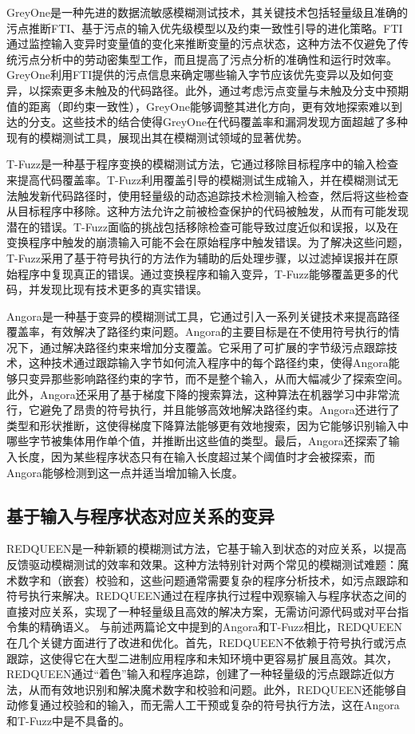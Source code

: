 \documentclass[10.5pt,compsoc]{CjC}
\theoremstyle{mystyle}
\begin{document}
GreyOne\cite{GREYONE}是一种先进的数据流敏感模糊测试技术，其关键技术包括轻量级且准确的污点推断FTI、基于污点的输入优先级模型以及约束一致性引导的进化策略。FTI通过监控输入变异时变量值的变化来推断变量的污点状态，这种方法不仅避免了传统污点分析中的劳动密集型工作，而且提高了污点分析的准确性和运行时效率。GreyOne利用FTI提供的污点信息来确定哪些输入字节应该优先变异以及如何变异，以探索更多未触及的代码路径。此外，通过考虑污点变量与未触及分支中预期值的距离（即约束一致性），GreyOne能够调整其进化方向，更有效地探索难以到达的分支。这些技术的结合使得GreyOne在代码覆盖率和漏洞发现方面超越了多种现有的模糊测试工具，展现出其在模糊测试领域的显著优势。

T-Fuzz\cite{T-Fuzz}是一种基于程序变换的模糊测试方法，它通过移除目标程序中的输入检查来提高代码覆盖率。T-Fuzz利用覆盖引导的模糊测试生成输入，并在模糊测试无法触发新代码路径时，使用轻量级的动态追踪技术检测输入检查，然后将这些检查从目标程序中移除。这种方法允许之前被检查保护的代码被触发，从而有可能发现潜在的错误。T-Fuzz面临的挑战包括移除检查可能导致过度近似和误报，以及在变换程序中触发的崩溃输入可能不会在原始程序中触发错误。为了解决这些问题，T-Fuzz采用了基于符号执行的方法作为辅助的后处理步骤，以过滤掉误报并在原始程序中复现真正的错误。通过变换程序和输入变异，T-Fuzz能够覆盖更多的代码，并发现比现有技术更多的真实错误。

Angora\cite{angora}是一种基于变异的模糊测试工具，它通过引入一系列关键技术来提高路径覆盖率，有效解决了路径约束问题。Angora的主要目标是在不使用符号执行的情况下，通过解决路径约束来增加分支覆盖。它采用了可扩展的字节级污点跟踪技术，这种技术通过跟踪输入字节如何流入程序中的每个路径约束，使得Angora能够只变异那些影响路径约束的字节，而不是整个输入，从而大幅减少了探索空间。此外，Angora还采用了基于梯度下降的搜索算法，这种算法在机器学习中非常流行，它避免了昂贵的符号执行，并且能够高效地解决路径约束。Angora还进行了类型和形状推断，这使得梯度下降算法能够更有效地搜索，因为它能够识别输入中哪些字节被集体用作单个值，并推断出这些值的类型。最后，Angora还探索了输入长度，因为某些程序状态只有在输入长度超过某个阈值时才会被探索，而Angora能够检测到这一点并适当增加输入长度。
\vspace {10mm}

\subsection{基于输入与程序状态对应关系的变异}
REDQUEEN\cite{redqueen}是一种新颖的模糊测试方法，它基于输入到状态的对应关系，以提高反馈驱动模糊测试的效率和效果。这种方法特别针对两个常见的模糊测试难题：魔术数字和（嵌套）校验和，这些问题通常需要复杂的程序分析技术，如污点跟踪和符号执行来解决。REDQUEEN通过在程序执行过程中观察输入与程序状态之间的直接对应关系，实现了一种轻量级且高效的解决方案，无需访问源代码或对平台指令集的精确语义。
	与前述两篇论文中提到的Angora和T-Fuzz相比，REDQUEEN在几个关键方面进行了改进和优化。首先，REDQUEEN不依赖于符号执行或污点跟踪，这使得它在大型二进制应用程序和未知环境中更容易扩展且高效。其次，REDQUEEN通过“着色”输入和程序追踪，创建了一种轻量级的污点跟踪近似方法，从而有效地识别和解决魔术数字和校验和问题。此外，REDQUEEN还能够自动修复通过校验和的输入，而无需人工干预或复杂的符号执行方法，这在Angora和T-Fuzz中是不具备的。
  \vspace {10mm}
  
\end{document}

